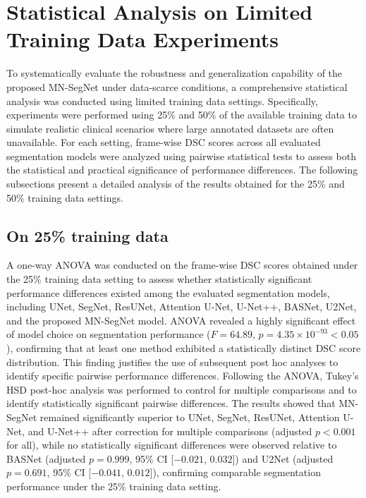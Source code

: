\documentclass[12pt,letterpaper]{article}
\begin{document}
 
\section{Statistical Analysis on Limited Training Data Experiments}

To systematically evaluate the robustness and generalization capability of the proposed MN-SegNet under data-scarce conditions, a comprehensive statistical analysis was conducted using limited training data settings. Specifically, experiments were performed using 25\% and 50\% of the available training data to simulate realistic clinical scenarios where large annotated datasets are often unavailable. For each setting, frame-wise DSC scores across all evaluated segmentation models were analyzed using pairwise statistical tests to assess both the statistical and practical significance of performance differences. The following subsections present a detailed analysis of the results obtained for the 25\% and 50\% training data settings.







\subsection{On 25\% training data}

A one-way ANOVA was conducted on the frame-wise DSC scores obtained under the 25\% training data setting to assess whether statistically significant performance differences existed among the evaluated segmentation models, including UNet, SegNet, ResUNet, Attention U-Net, U-Net++, BASNet, U2Net, and the proposed MN-SegNet model. ANOVA revealed a highly significant effect of model choice on segmentation performance ($F = 64.89$, $p = 4.35 \times 10^{-93}< 0.05$), confirming that at least one method exhibited a statistically distinct DSC score distribution. This finding justifies the use of subsequent post hoc analyses to identify specific pairwise performance differences. Following the ANOVA, Tukey’s HSD post-hoc analysis was performed to control for multiple comparisons and to identify statistically significant pairwise
differences. The results showed that MN-SegNet remained significantly superior to UNet, SegNet, ResUNet, Attention U-Net, and U-Net++ after correction for multiple comparisons (adjusted $p < 0.001$ for all), while no statistically significant
differences were observed relative to BASNet (adjusted $p = 0.999$, 95\% CI [$-0.021$, $0.032$]) and U2Net (adjusted $p = 0.691$, 95\% CI [$-0.041$, $0.012$]), confirming comparable segmentation performance under the 25\% training data setting.
\end{document}
